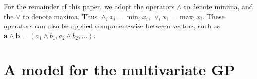 For the remainder of this paper, we adopt the operators $\wedge$ to denote minima, and the $\vee$
  to denote maxima.  Thus $\wedge_i x_i = \min_i x_i$, $\vee_i x_i = \max_i x_i$.  These operators can
  also be applied component-wise between vectors, such as $\bm{a}\wedge\bm{b} = (a_1\wedge b_1, a_2\wedge b_2,\ldots)$.
  
\section{A model for the multivariate GP}
